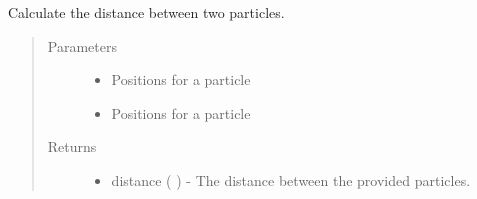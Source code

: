 \documentclass[letterpaper,12pt,english,openany,oneside]{sphinxmanual}
\begin{document}
\begin{fulllineitems}
\label{\detokenize{utilities:utilities.util.distance}}
Calculate the distance between two particles.
\begin{quote}\begin{description}
\item[{Parameters}] \leavevmode\begin{itemize}
\item {} 
 \textendash{} Positions for a particle

\item {} 
 \textendash{} Positions for a particle

\end{itemize}

\item[{Returns}] \leavevmode
\begin{itemize}
\item {} 
distance (  ) - The distance between the provided particles.

\end{itemize}


\end{description}\end{quote}

\end{fulllineitems}

\end{document}
